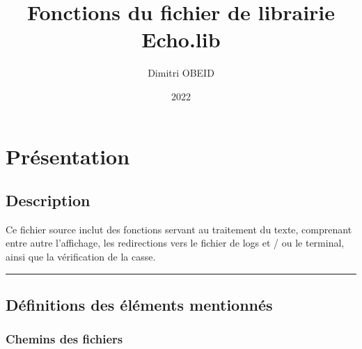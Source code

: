 \documentclass[a4paper,10pt]{article}
\title{\color{sec1}Fonctions du fichier de librairie \color{path}Echo.lib}\color{text}
\author{Dimitri OBEID}
\date{2022}
\begin{document}
    \maketitle
    \newpage

    \hypertarget{contents}{}
    \tableofcontents
    \newpage

    \color{sec1}
    \section{Présentation}\color{text}

    \color{sec2}
    \subsection{Description}\color{text}

    \begin{justify}
        Ce fichier source inclut des fonctions servant au traitement du texte, comprenant entre autre l'affichage, les redirections vers le fichier de logs et / ou le terminal, ainsi que la vérification de la casse.
    \end{justify}




    \color{sec2}\par\noindent\rule{\textwidth}{0.4pt}\color{text}

    \color{sec2}
    \subsection{Définitions des éléments mentionnés}\color{text}

    \color{sec3}
    \subsubsection{Chemins des fichiers}\color{text}
\end{document}
